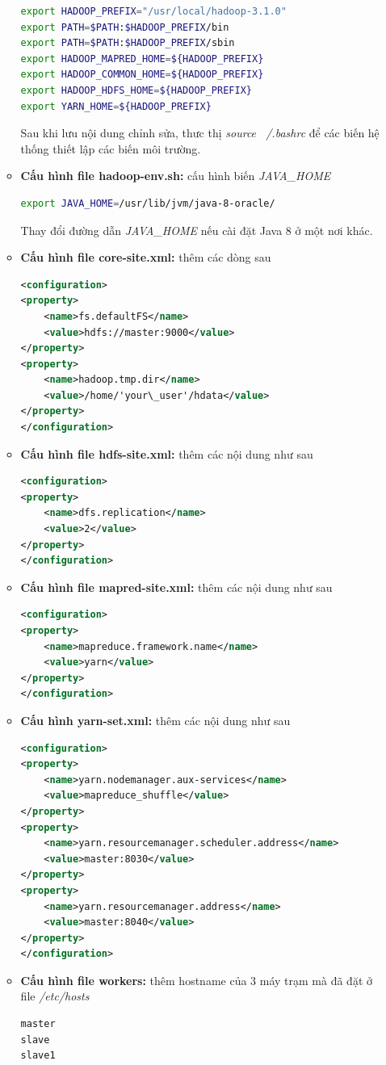 \begin{enumerate}
\begin{itemize}
				\begin{lstlisting}[language=bash]
export HADOOP_PREFIX="/usr/local/hadoop-3.1.0"
export PATH=$PATH:$HADOOP_PREFIX/bin
export PATH=$PATH:$HADOOP_PREFIX/sbin
export HADOOP_MAPRED_HOME=${HADOOP_PREFIX}
export HADOOP_COMMON_HOME=${HADOOP_PREFIX}
export HADOOP_HDFS_HOME=${HADOOP_PREFIX}
export YARN_HOME=${HADOOP_PREFIX}
				\end{lstlisting}
				Sau khi lưu nội dung chỉnh sửa, thưc thị \textit{source ~/.bashrc} để các biến hệ thống thiết lập các biến môi trường.
				\item \textbf{Cấu hình file hadoop-env.sh: }cấu hình biến \textit{JAVA\_HOME}
				\begin{lstlisting}[language=bash]
export JAVA_HOME=/usr/lib/jvm/java-8-oracle/
				\end{lstlisting}
				Thay đổi đường dẫn \textit{JAVA\_HOME} nếu cài đặt Java 8 ở một nơi khác.
				\item \textbf{Cấu hình file core-site.xml: }thêm các dòng sau
				\begin{lstlisting}[language=XML]
<configuration>
<property>
	<name>fs.defaultFS</name>
	<value>hdfs://master:9000</value>
</property>
<property>
	<name>hadoop.tmp.dir</name>
	<value>/home/'your\_user'/hdata</value>
</property>
</configuration>
				\end{lstlisting}
				\item \textbf{Cấu hình file hdfs-site.xml: }thêm các nội dung như sau
				\begin{lstlisting}[language=XML]
<configuration>
<property>
	<name>dfs.replication</name>
	<value>2</value>
</property>
</configuration>
				\end{lstlisting}
				\item \textbf{Cấu hình file mapred-site.xml: }thêm các nội dung như sau
				\begin{lstlisting}[language=XML]
<configuration>
<property>
	<name>mapreduce.framework.name</name>
	<value>yarn</value>
</property>
</configuration>
				\end{lstlisting}
				\item \textbf{Cấu hình yarn-set.xml: }thêm các nội dung như sau
				\begin{lstlisting}[language=XML]
<configuration>
<property>
	<name>yarn.nodemanager.aux-services</name>
	<value>mapreduce_shuffle</value>
</property>
<property>
	<name>yarn.resourcemanager.scheduler.address</name>
	<value>master:8030</value>
</property>
<property>
	<name>yarn.resourcemanager.address</name>
	<value>master:8040</value>
</property>
</configuration>
				\end{lstlisting}
				\item \textbf{Cấu hình file workers: }thêm hostname của 3 máy trạm mà đã đặt ở file \textit{/etc/hosts}
				\begin{lstlisting}
master
slave
slave1
				\end{lstlisting}
			\end{itemize}
			
			
			
		\end{enumerate}
		
